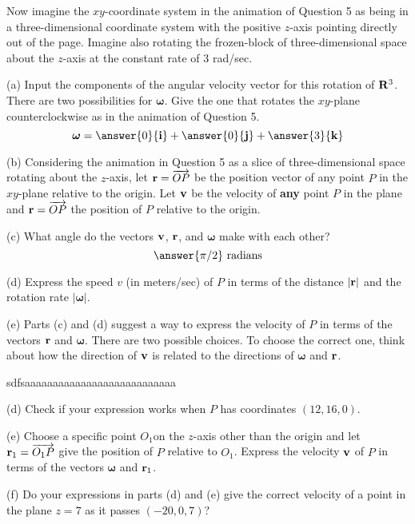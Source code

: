 \documentclass{ximera}
\begin{document}
\begin{question}  \label{Qhfnbyt:Cross}
Now imagine the $xy$-coordinate system in the animation of Question 5  as being in a three-dimensional coordinate system with the positive $z$-axis pointing directly out of the page. Imagine also rotating the frozen-block of three-dimensional space about the $z$-axis at the constant rate of $3$ rad/sec. 


(a) Input the components of the angular velocity vector for this rotation of ${\bf R}^3$. There are two possibilities for $\boldsymbol{\omega}$. Give the one that rotates the $xy$-plane counterclockwise as in the animation of Question 5. 
\[
\boldsymbol{\omega} = \answer{0}{\bf i} + \answer{0}{\bf j} + \answer{3}{\bf k}
\]

(b) Considering the animation in Question 5 as a slice of three-dimensional space rotating about the $z$-axis, let ${\bf r} = \overrightarrow{OP}$ be the position vector of any point $P$ in the $xy$-plane relative to the origin. Let ${\bf v}$ be the velocity of {\bf any} point $P$ in the plane and ${\bf r} = \overrightarrow{OP}$ the position of $P$ relative to the origin.

(c) What angle do the vectors ${\bf v}$,  ${\bf r}$, and $\boldsymbol{\omega}$ make with each other?
\[
     \answer{\pi/2}\text{ radians}
\]

(d) Express the speed $v$ (in meters/sec) of $P$ in terms of the distance $|{\bf r}|$ and the rotation rate $|\boldsymbol{\omega}|$.

(e) Parts (c) and (d) suggest a way to express the velocity of $P$ in terms of the vectors ${\bf r}$ and $\boldsymbol{\omega}$.
There are two possible choices. To choose the correct one, think about how the direction of ${\bf v}$ is related to the directions of $\boldsymbol{\omega}$ and ${\bf r}$. 


sdfsaaaaaaaaaaaaaaaaaaaaaaaaaaa


(d) Check if your expression works when $P$ has coordinates $(12, 16,0)$.

(e) Choose a specific point $O_1$on the $z$-axis other than the origin and let ${\bf r}_1 = \overrightarrow{O_1P}$ give the position of $P$ relative to $O_1$. Express the velocity ${\bf v}$ of $P$ in terms of the vectors ${\boldsymbol{\omega}}$ and ${\bf r}_1$. 


(f) Do your expressions in parts (d) and (e) give the correct velocity of a point in the plane $z=7$ as it passes $(-20,0,7)$?


\end{question}
\end{document}
